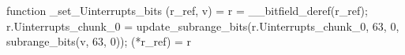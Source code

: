 function _set_Uinterrupts_bits (r_ref, v) = {
    r = __bitfield_deref(r_ref);
    r.Uinterrupts_chunk_0 = update_subrange_bits(r.Uinterrupts_chunk_0, 63, 0, subrange_bits(v, 63, 0));
    (*r_ref) = r
}
